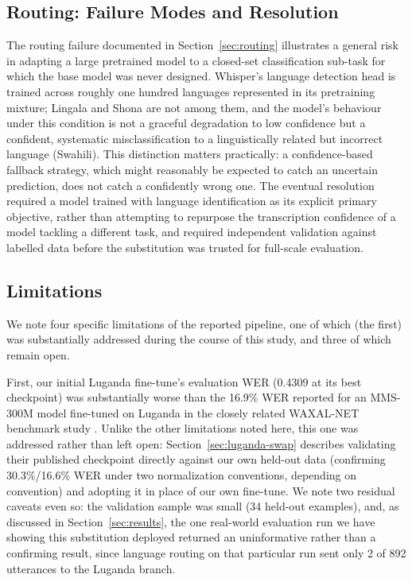 \documentclass[11pt]{article}
\begin{document}
\subsection{Routing: Failure Modes and Resolution}
\label{sec:routing-failure}

The routing failure documented in Section~\ref{sec:routing} illustrates a general risk in adapting a large pretrained model to a closed-set classification sub-task for which the base model was never designed. Whisper's language detection head is trained across roughly one hundred languages represented in its pretraining mixture; Lingala and Shona are not among them, and the model's behaviour under this condition is not a graceful degradation to low confidence but a confident, systematic misclassification to a linguistically related but incorrect language (Swahili). This distinction matters practically: a confidence-based fallback strategy, which might reasonably be expected to catch an uncertain prediction, does not catch a confidently wrong one. The eventual resolution required a model trained with language identification as its explicit primary objective, rather than attempting to repurpose the transcription confidence of a model tackling a different task, and required independent validation against labelled data before the substitution was trusted for full-scale evaluation.

\subsection{Limitations}
\label{sec:limitations}

We note four specific limitations of the reported pipeline, one of which (the first) was substantially addressed during the course of this study, and three of which remain open.

First, our initial Luganda fine-tune's evaluation WER (0.4309 at its best checkpoint) was substantially worse than the 16.9\% WER reported for an MMS-300M model fine-tuned on Luganda in the closely related WAXAL-NET benchmark study \cite{olufemi2026waxalnet}. Unlike the other limitations noted here, this one was addressed rather than left open: Section~\ref{sec:luganda-swap} describes validating their published checkpoint \cite{waxalbenchmarking2026mms300mlug} directly against our own held-out data (confirming 30.3\%/16.6\% WER under two normalization conventions, depending on convention) and adopting it in place of our own fine-tune. We note two residual caveats even so: the validation sample was small (34 held-out examples), and, as discussed in Section~\ref{sec:results}, the one real-world evaluation run we have showing this substitution deployed returned an uninformative rather than a confirming result, since language routing on that particular run sent only 2 of 892 utterances to the Luganda branch.
\end{document}

